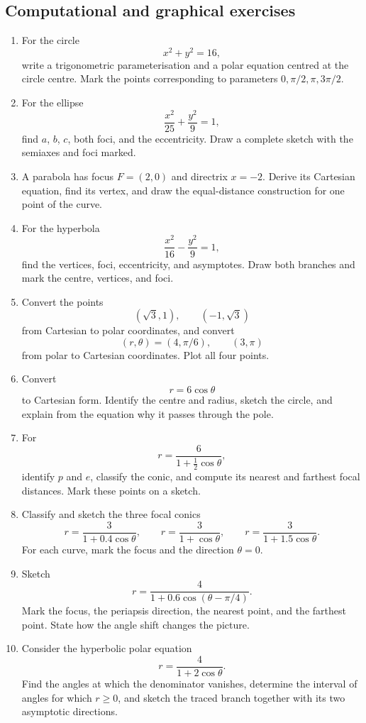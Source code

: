 \subsection{Computational and graphical exercises}

\begin{enumerate}

\item For the circle
\[
x^2+y^2=16,
\]
write a trigonometric parameterisation and a polar equation centred at the
circle centre. Mark the points corresponding to parameters
$0,\pi/2,\pi,3\pi/2$.

\item For the ellipse
\[
\frac{x^2}{25}+\frac{y^2}{9}=1,
\]
find $a$, $b$, $c$, both foci, and the eccentricity. Draw a complete sketch
with the semiaxes and foci marked.

\item A parabola has focus $F=(2,0)$ and directrix $x=-2$. Derive its Cartesian
equation, find its vertex, and draw the equal-distance construction for one
point of the curve.

\item For the hyperbola
\[
\frac{x^2}{16}-\frac{y^2}{9}=1,
\]
find the vertices, foci, eccentricity, and asymptotes. Draw both branches and
mark the centre, vertices, and foci.

\item Convert the points
\[
(\sqrt3,1),\qquad (-1,\sqrt3)
\]
from Cartesian to polar coordinates, and convert
\[
(r,\theta)=(4,\pi/6),\qquad (3,\pi)
\]
from polar to Cartesian coordinates. Plot all four points.

\item Convert
\[
r=6\cos\theta
\]
to Cartesian form. Identify the centre and radius, sketch the circle, and
explain from the equation why it passes through the pole.

\item For
\[
r=\frac{6}{1+\frac12\cos\theta},
\]
identify $p$ and $e$, classify the conic, and compute its nearest and farthest
focal distances. Mark these points on a sketch.

\item Classify and sketch the three focal conics
\[
r=\frac{3}{1+0.4\cos\theta},
\qquad
r=\frac{3}{1+\cos\theta},
\qquad
r=\frac{3}{1+1.5\cos\theta}.
\]
For each curve, mark the focus and the direction $\theta=0$.

\item Sketch
\[
r=\frac{4}{1+0.6\cos(\theta-\pi/4)}.
\]
Mark the focus, the periapsis direction, the nearest point, and the farthest
point. State how the angle shift changes the picture.

\item Consider the hyperbolic polar equation
\[
r=\frac{4}{1+2\cos\theta}.
\]
Find the angles at which the denominator vanishes, determine the interval of
angles for which $r\geq0$, and sketch the traced branch together with its two
asymptotic directions.

\end{enumerate}

